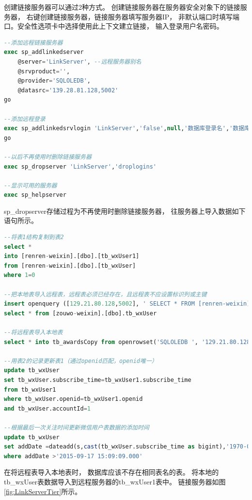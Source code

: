 \documentclass{book}
\begin{document}
创建链接服务器可以通过2种方式。
创建链接服务器在服务器安全对象下的链接服务器，
右键创建链接服务器，链接服务器填写服务器IP，
非默认端口时填写端口。安全性选项卡中选择使用此上下文建立链接，
输入登录用户名密码。

\begin{lstlisting}[language=SQL]
--添加远程链接服务器
exec sp_addlinkedserver
	@server='LinkServer', --远程服务器别名
	@srvproduct='',
	@provider='SQLOLEDB',
	@datasrc='139.28.81.128,5002'
go

--添加远程登录
exec sp_addlinkedsrvlogin 'LinkServer','false',null,'数据库登录名','数据库登录密码'
go

--以后不再使用时删除链接服务器  
exec sp_dropserver 'LinkServer','droplogins'

--显示可用的服务器
exec sp_helpserver 
\end{lstlisting}

sp\_dropserver存储过程为不再使用时删除链接服务器，
往服务器上导入数据如下语句所示。

\begin{lstlisting}[language=SQL]
--将表1结构复制到表2
select *
into [renren-weixin].[dbo].[tb_wxUser1]
from [renren-weixin].[dbo].[tb_wxUser] 
where 1=0

--把本地表导入远程表，远程表必须已经存在，且远程表不应设置标识列或主键 
insert openquery ([129.21.80.128,5002], ' SELECT * FROM [renren-weixin].[dbo].[tb_wxUser1] ' ) 
select * from [zouwo-weixin].[dbo].tb_wxUser

--将远程表导入本地表
select * into tb_awardsCopy from openrowset('SQLOLEDB ', '129.21.80.128,5002'; 'renren-admin'; 'renren-admin!@#','select * from [renren-system].[dbo].[tb_awards]')

--用表2的记录更新表1（通过openid匹配，openid唯一）
update tb_wxUser
set tb_wxUser.subscribe_time=tb_wxUser1.subscribe_time
from tb_wxUser1
where tb_wxUser.openid=tb_wxUser1.openid
and tb_wxUser.accountId=1 

--根据最后一次关注时间更新微信用户表数据的添加时间
update tb_wxUser
set addDate =dateadd(s,cast(tb_wxUser.subscribe_time as bigint),'1970-01-01 00:00:00:000')
where addDate >'2015-09-17 15:09:09.000'
\end{lstlisting}

在将远程表导入本地表时，
数据库应该不存在相同表名的表。
将本地的tb\_wxUser表数据导入到远程服务器的tb\_wxUser1表中。
链接服务器如图\ref{fig:LinkServerTier}所示。
\end{document}
